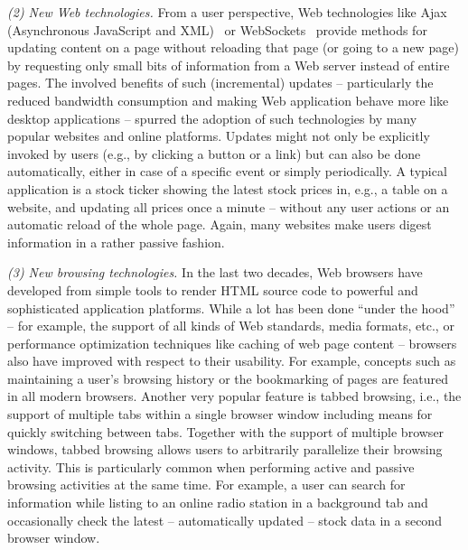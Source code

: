 \documentclass[11pt,fleqn,twoside]{article}
\begin{document}
\textit{(2) New Web technologies.}
From a user perspective, Web technologies like Ajax (Asynchronous JavaScript and XML)~\cite{Holdener08Ajax} or WebSockets~\cite{Fette11WebSockets} provide methods for updating content on a page without reloading that page (or going to a new page) by requesting only small bits of information from a Web server instead of entire pages. The involved benefits of such (incremental) updates -- particularly the reduced bandwidth consumption and making Web application behave more like desktop applications -- spurred the adoption of such technologies by many popular websites and online platforms. Updates might not only be explicitly invoked by users (e.g., by clicking a button or a link) but can also be done automatically, either in case of a specific event or simply periodically. A typical application is a stock ticker showing the latest stock prices in, e.g., a table on a website, and updating all prices once a minute -- without any user actions or an automatic reload of the whole page. Again, many websites make 
users digest information in a rather passive fashion.

\textit{(3) New browsing technologies.}
In the last two decades, Web browsers have developed from simple tools to render HTML source code to powerful and sophisticated application platforms. While a lot has been done ``under the hood'' -- for example, the support of all kinds of Web standards, media formats, etc., or performance optimization techniques like caching of web page content -- browsers also have improved with respect to their usability. For example, concepts such as maintaining a user's browsing history or the bookmarking of pages are featured in all modern browsers. Another very popular feature is tabbed browsing, i.e., the support of multiple tabs within a single browser window including means for quickly switching between tabs. Together with the support of multiple browser windows, tabbed browsing allows users to arbitrarily parallelize their browsing activity. This is particularly common when performing active and passive browsing activities at the same time. For example, a user can search for information while listing to an online 
radio station in a background tab and occasionally check the latest -- automatically updated -- stock data in a second browser window.
\end{document}
